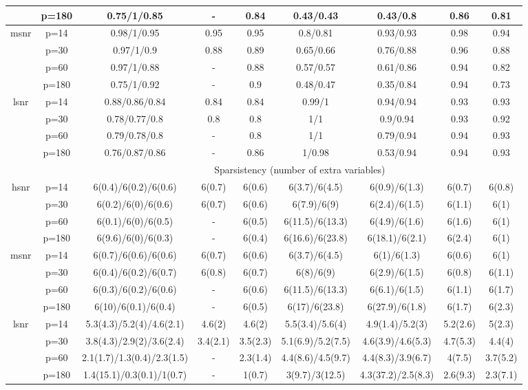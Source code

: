 \begin{table}[ht]
{\begin{tabular}{|c|c|ccccccc|}
   & p=180 & 0.75/1/0.85 & - & 0.84 & 0.43/0.43 & 0.43/0.8 & 0.86 & 0.81 \\ 
  \midrule\multirow{4}[2]{*}{msnr} & p=14 & 0.98/1/0.95 & 0.95 & 0.95 & 0.8/0.81 & 0.93/0.93 & 0.98 & 0.94 \\ 
   & p=30 & 0.97/1/0.9 & 0.88 & 0.89 & 0.65/0.66 & 0.76/0.88 & 0.96 & 0.88 \\ 
   & p=60 & 0.97/1/0.88 & - & 0.88 & 0.57/0.57 & 0.61/0.86 & 0.94 & 0.82 \\ 
   & p=180 & 0.75/1/0.92 & - & 0.9 & 0.48/0.47 & 0.35/0.84 & 0.94 & 0.73 \\ 
  \midrule\multirow{4}[2]{*}{lsnr} & p=14 & 0.88/0.86/0.84 & 0.84 & 0.84 & 0.99/1 & 0.94/0.94 & 0.93 & 0.93 \\ 
   & p=30 & 0.78/0.77/0.8 & 0.8 & 0.8 & 1/1 & 0.9/0.94 & 0.93 & 0.92 \\ 
   & p=60 & 0.79/0.78/0.8 & - & 0.8 & 1/1 & 0.79/0.94 & 0.94 & 0.93 \\ 
   & p=180 & 0.76/0.87/0.86 & - & 0.86 & 1/0.98 & 0.53/0.94 & 0.94 & 0.93 \\ 
   \midrule 
 \multicolumn{1}{|c}{} &       & \multicolumn{7}{c|}{Sparsistency (number of extra variables)} \\
\midrule\multirow{4}[2]{*}{hsnr} & p=14 & 6(0.4)/6(0.2)/6(0.6) & 6(0.7) & 6(0.6) & 6(3.7)/6(4.5) & 6(0.9)/6(1.3) & 6(0.7) & 6(0.8) \\ 
   & p=30 & 6(0.2)/6(0)/6(0.6) & 6(0.7) & 6(0.6) & 6(7.9)/6(9) & 6(2.4)/6(1.5) & 6(1.1) & 6(1) \\ 
   & p=60 & 6(0.1)/6(0)/6(0.5) & - & 6(0.5) & 6(11.5)/6(13.3) & 6(4.9)/6(1.6) & 6(1.6) & 6(1) \\ 
   & p=180 & 6(9.6)/6(0)/6(0.3) & - & 6(0.4) & 6(16.6)/6(23.8) & 6(18.1)/6(2.1) & 6(2.4) & 6(1) \\ 
  \midrule\multirow{4}[2]{*}{msnr} & p=14 & 6(0.7)/6(0.6)/6(0.6) & 6(0.7) & 6(0.6) & 6(3.7)/6(4.5) & 6(1)/6(1.3) & 6(0.6) & 6(1) \\ 
   & p=30 & 6(0.4)/6(0.2)/6(0.7) & 6(0.8) & 6(0.7) & 6(8)/6(9) & 6(2.9)/6(1.5) & 6(0.8) & 6(1.1) \\ 
   & p=60 & 6(0.3)/6(0.2)/6(0.6) & - & 6(0.6) & 6(11.5)/6(13.3) & 6(6.1)/6(1.5) & 6(1.1) & 6(1.7) \\ 
   & p=180 & 6(10)/6(0.1)/6(0.4) & - & 6(0.5) & 6(17)/6(23.8) & 6(27.9)/6(1.8) & 6(1.7) & 6(2.3) \\ 
  \midrule\multirow{4}[2]{*}{lsnr} & p=14 & 5.3(4.3)/5.2(4)/4.6(2.1) & 4.6(2) & 4.6(2) & 5.5(3.4)/5.6(4) & 4.9(1.4)/5.2(3) & 5.2(2.6) & 5(2.3) \\ 
   & p=30 & 3.8(4.3)/2.9(2)/3.6(2.4) & 3.4(2.1) & 3.5(2.3) & 5.1(6.9)/5.2(7.5) & 4.6(3.9)/4.6(5.3) & 4.7(5.3) & 4.4(4) \\ 
   & p=60 & 2.1(1.7)/1.3(0.4)/2.3(1.5) & - & 2.3(1.4) & 4.4(8.6)/4.5(9.7) & 4.4(8.3)/3.9(6.7) & 4(7.5) & 3.7(5.2) \\ 
   & p=180 & 1.4(15.1)/0.3(0.1)/1(0.7) & - & 1(0.7) & 3(9.7)/3(12.5) & 4.3(37.2)/2.5(8.3) & 2.6(9.3) & 2.3(7.1) \\ 
   \bottomrule 
\end{tabular}
}
\end{table}
